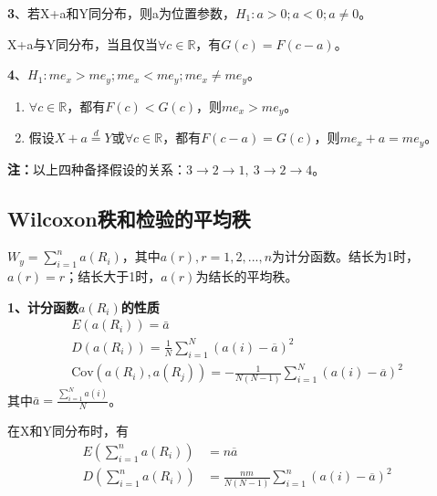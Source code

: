 \documentclass[lang=cn,10pt]{elegantbook}
\begin{document}
\textbf{3}、若X+a和Y同分布，则a为位置参数，$H_1:a>0;a<0;a\neq 0$。
\begin{theorem}
    X+a与Y同分布，当且仅当$\forall c\in \mathbb{R}$，有$G(c)= F(c-a)$。
\end{theorem}

\textbf{4}、$H_1:me_x > me_y; me_x < me_y; me_x \neq me_y$。
\begin{theorem}
    \begin{enumerate}[(1)]
        \item $\forall c \in \mathbb{R}$，都有$F(c) < G(c)$，则$me_x > me_y$。
        \item 假设$X+a\overset{d}{=}Y$或$\forall c \in \mathbb{R}$，都有$F(c-a) = G(c)$，则$me_x+a = me_y$。
    \end{enumerate}
\end{theorem}

\textbf{注：}以上四种备择假设的关系：$3 \rightarrow 2 \rightarrow 1,~ 3 \rightarrow 2 \rightarrow 4$。

\subsection{Wilcoxon秩和检验的平均秩}
$W_y = \sum_{i = 1}^{n}a(R_i)$，其中$a(r),r = 1,2,...,n$为计分函数。结长为1时，$a(r) = r$；结长大于1时，$a(r)$为结长的平均秩。

\textbf{1、计分函数$a(R_i)$的性质}
\begin{equation}
    \begin{gathered}
        E(a(R_{i}))=\bar{a}  \\
        D(a(R_i))=\frac{1}{N}\sum_{i=1}^{N}(a(i)-\overline{a})^2 \\
        \mathrm{Cov}\left(a(R_{i}),a(R_{j})\right)=-\frac{1}{N(N-1)}\sum_{i=1}^{N}(a(i)-\overline{a})^{2}
    \end{gathered}
\end{equation}
其中$\bar{a} = \frac{\sum_{i=1}^N a(i)}N$。

\begin{theorem}
    在X和Y同分布时，有
    \begin{equation}
        \begin{aligned}
            E(\sum_{i=1}^na(R_i)) & =n\overline{a}                                      \\
            D(\sum_{i=1}^na(R_i)) & =\frac{nm}{N(N-1)}\sum_{i=1}^n(a(i)-\overline{a})^2
        \end{aligned}
    \end{equation}
\end{theorem}
\end{document}
